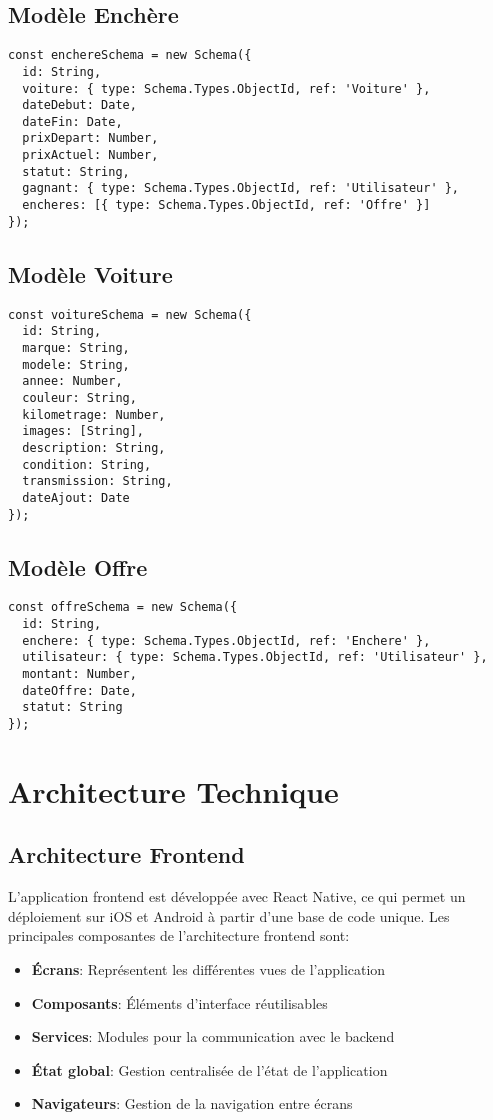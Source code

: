 \subsection{Modèle Enchère}
\begin{verbatim}
const enchereSchema = new Schema({
  id: String,
  voiture: { type: Schema.Types.ObjectId, ref: 'Voiture' },
  dateDebut: Date,
  dateFin: Date,
  prixDepart: Number,
  prixActuel: Number,
  statut: String,
  gagnant: { type: Schema.Types.ObjectId, ref: 'Utilisateur' },
  encheres: [{ type: Schema.Types.ObjectId, ref: 'Offre' }]
});
\end{verbatim}

\subsection{Modèle Voiture}
\begin{verbatim}
const voitureSchema = new Schema({
  id: String,
  marque: String,
  modele: String,
  annee: Number,
  couleur: String,
  kilometrage: Number,
  images: [String],
  description: String,
  condition: String,
  transmission: String,
  dateAjout: Date
});
\end{verbatim}

\subsection{Modèle Offre}
\begin{verbatim}
const offreSchema = new Schema({
  id: String,
  enchere: { type: Schema.Types.ObjectId, ref: 'Enchere' },
  utilisateur: { type: Schema.Types.ObjectId, ref: 'Utilisateur' },
  montant: Number,
  dateOffre: Date,
  statut: String
});
\end{verbatim}

\section{Architecture Technique}

\subsection{Architecture Frontend}
L'application frontend est développée avec React Native, ce qui permet un déploiement sur iOS et Android à partir d'une base de code unique. Les principales composantes de l'architecture frontend sont:

\begin{itemize}
    \item \textbf{Écrans}: Représentent les différentes vues de l'application
    \item \textbf{Composants}: Éléments d'interface réutilisables
    \item \textbf{Services}: Modules pour la communication avec le backend
    \item \textbf{État global}: Gestion centralisée de l'état de l'application
    \item \textbf{Navigateurs}: Gestion de la navigation entre écrans
\end{itemize}

